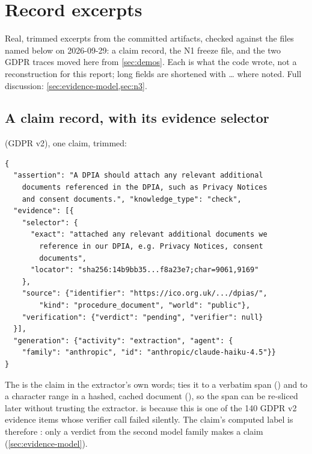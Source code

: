 \section{Record excerpts}
\label{app:records}

Real, trimmed excerpts from the committed artifacts, checked against the files named below on
2026-09-29: a claim record, the N1 freeze file, and the two GDPR traces moved here from
\cref{sec:demos}. Each is what the code wrote, not a reconstruction for this report; long fields are
shortened with \ldots{} where noted. Full discussion: \cref{sec:evidence-model,sec:n3}.

\subsection{A claim record, with its evidence selector}

 (GDPR v2), one claim, trimmed:

{\small
\begin{verbatim}
{
  "assertion": "A DPIA should attach any relevant additional
    documents referenced in the DPIA, such as Privacy Notices
    and consent documents.", "knowledge_type": "check",
  "evidence": [{
    "selector": {
      "exact": "attached any relevant additional documents we
        reference in our DPIA, e.g. Privacy Notices, consent
        documents",
      "locator": "sha256:14b9bb35...f8a23e7;char=9061,9169"
    },
    "source": {"identifier": "https://ico.org.uk/.../dpias/",
        "kind": "procedure_document", "world": "public"},
    "verification": {"verdict": "pending", "verifier": null}
  }],
  "generation": {"activity": "extraction", "agent": {
    "family": "anthropic", "id": "anthropic/claude-haiku-4.5"}}
}
\end{verbatim}
}

The  is the claim in the extractor's own words;  ties it
to a verbatim span () and to a character range in a hashed, cached document
(), so the span can be re-sliced later without trusting the extractor.
 is  because this is one of the 140 GDPR v2 evidence items
whose verifier call failed silently. The claim's computed label is therefore
: only a  verdict from the second model family makes a
claim  (\cref{sec:evidence-model}).

